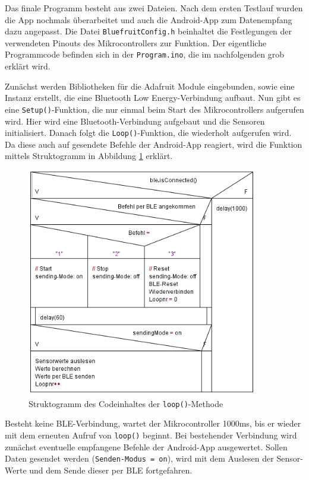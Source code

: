 Das finale Programm besteht aus zwei Dateien. Nach dem ersten Testlauf wurden die App nochmals überarbeitet und auch die Android-App zum Datenempfang dazu angepasst. Die Datei \texttt{BluefruitConfig.h} beinhaltet die Festlegungen der verwendeten Pinouts des Mikrocontrollers zur Funktion. Der eigentliche Programmcode befinden sich in der \texttt{Program.ino}, die im nachfolgenden grob erklärt wird.

Zunächst werden Bibliotheken für die Adafruit Module eingebunden, sowie eine Instanz erstellt, die eine Bluetooth Low Energy-Verbindung aufbaut. Nun gibt es eine \texttt{Setup()}-Funktion, die nur einmal beim Start des Mikrocontrollers aufgerufen wird. Hier wird eine Bluetooth-Verbindung aufgebaut und die Sensoren initialisiert. Danach folgt die \texttt{Loop()}-Funktion, die wiederholt aufgerufen wird. Da diese auch auf gesendete Befehle der Android-App reagiert, wird die Funktion mittels Struktogramm in Abbildung \ref{fig:k3_loopstructo} erklärt.

\begin{figure}[h]
	\centering
	\includegraphics[width=0.9\textwidth]{images/k3-loopstructo.png}
	\caption {Struktogramm des Codeinhaltes der \texttt{loop()}-Methode}
	\label{fig:k3_loopstructo}
\end{figure}

Besteht keine BLE-Verbindung, wartet der Mikrocontroller 1000ms, bis er wieder mit dem erneuten Aufruf von \texttt{loop()} beginnt. Bei bestehender Verbindung wird zunächst eventuelle empfangene Befehle der Android-App ausgewertet. Sollen Daten gesendet werden (\texttt{Senden-Modus = on}), wird mit dem Auslesen der Sensor-Werte und dem Sende dieser per BLE fortgefahren. 

